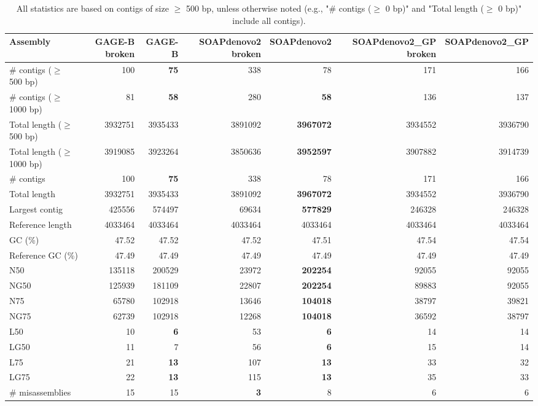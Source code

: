 \documentclass[12pt,a4paper]{article}
\begin{document}
\begin{table}[ht]
\begin{center}
\caption{All statistics are based on contigs of size $\geq$ 500 bp, unless otherwise noted (e.g., "\# contigs ($\geq$ 0 bp)" and "Total length ($\geq$ 0 bp)" include all contigs).}
\begin{tabular}{|l*{6}{|r}|}
\hline
Assembly & GAGE-B broken & GAGE-B & SOAPdenovo2 broken & SOAPdenovo2 & SOAPdenovo2\_GP broken & SOAPdenovo2\_GP \\ \hline
\# contigs ($\geq$ 500 bp) & 100 & {\bf 75} & 338 & 78 & 171 & 166 \\ \hline
\# contigs ($\geq$ 1000 bp) & 81 & {\bf 58} & 280 & {\bf 58} & 136 & 137 \\ \hline
Total length ($\geq$ 500 bp) & 3932751 & 3935433 & 3891092 & {\bf 3967072} & 3934552 & 3936790 \\ \hline
Total length ($\geq$ 1000 bp) & 3919085 & 3923264 & 3850636 & {\bf 3952597} & 3907882 & 3914739 \\ \hline
\# contigs & 100 & {\bf 75} & 338 & 78 & 171 & 166 \\ \hline
Total length & 3932751 & 3935433 & 3891092 & {\bf 3967072} & 3934552 & 3936790 \\ \hline
Largest contig & 425556 & 574497 & 69634 & {\bf 577829} & 246328 & 246328 \\ \hline
Reference length & 4033464 & 4033464 & 4033464 & 4033464 & 4033464 & 4033464 \\ \hline
GC (\%) & 47.52 & 47.52 & 47.52 & 47.51 & 47.54 & 47.54 \\ \hline
Reference GC (\%) & 47.49 & 47.49 & 47.49 & 47.49 & 47.49 & 47.49 \\ \hline
N50 & 135118 & 200529 & 23972 & {\bf 202254} & 92055 & 92055 \\ \hline
NG50 & 125939 & 181109 & 22807 & {\bf 202254} & 89883 & 92055 \\ \hline
N75 & 65780 & 102918 & 13646 & {\bf 104018} & 38797 & 39821 \\ \hline
NG75 & 62739 & 102918 & 12268 & {\bf 104018} & 36592 & 38797 \\ \hline
L50 & 10 & {\bf 6} & 53 & {\bf 6} & 14 & 14 \\ \hline
LG50 & 11 & 7 & 56 & {\bf 6} & 15 & 14 \\ \hline
L75 & 21 & {\bf 13} & 107 & {\bf 13} & 33 & 32 \\ \hline
LG75 & 22 & {\bf 13} & 115 & {\bf 13} & 35 & 33 \\ \hline
\# misassemblies & 15 & 15 & {\bf 3} & 8 & 6 & 6 \\ \hline

\end{tabular}
\end{center}
\end{table}
\end{document}
